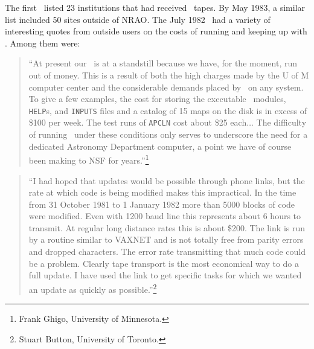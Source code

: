 The first \Aipsletter\ listed 23 institutions that had received \AIPS\
tapes.  By May 1983, a similar list included 50 sites outside of
\hbox{NRAO}.  The July 1982 \Aipsletter\ had a variety of interesting
quotes from outside users on the costs of running and keeping up with
\hbox{\AIPS}.  Among them were:\vspace{-6pt}
\begin{quotation}
``At present our \AIPS\ is at a standstill because we have, for the
moment, run out of money.  This is a result of both the high charges
made by the U of M computer center and the considerable demands placed
by \AIPS\ on any system.  To give a few examples, the cost for storing
the executable \AIPS\ modules, {\tt HELP}s, and {\tt INPUTS} files and
a catalog of 15 maps on the disk is in excess of \$100 per week.  The
test runs of {\tt APCLN} cost about \$25 each$\ldots$ The difficulty
of running \AIPS\ under these conditions only serves to underscore the
need for a dedicated Astronomy Department computer, a point we have of
course been making to NSF for years.''\footnote{Frank Ghigo,
University of Minnesota.}
\end{quotation}
\begin{quotation}
``I had hoped that updates would be possible through phone links, but
the rate at which code is being modified makes this impractical.  In
the time from 31 October 1981 to 1 January 1982 more than 5000 blocks
of code were modified.  Even with 1200 baud line this represents about
6 hours to transmit.  At regular long distance rates this is about
\$200.  The link is run by a routine similar to VAXNET and is not
totally free from parity errors and dropped characters.  The error
rate transmitting that much code could be a problem.  Clearly tape
transport is the most economical way to do a full update.  I have used
the link to get specific tasks for which we wanted an update as
quickly as possible.''\footnote{Stuart Button, University of Toronto.}
\end{quotation}

